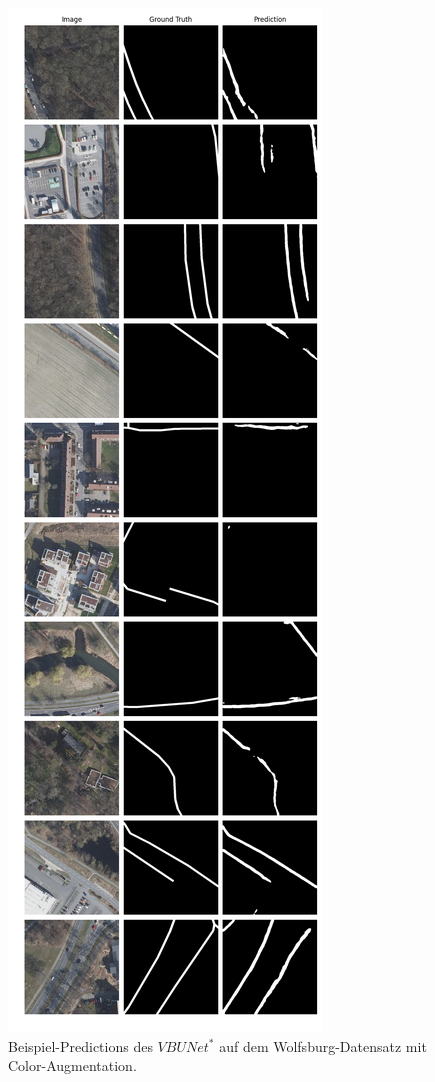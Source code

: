 \begin{figure}
	\centering
	\includegraphics[width=.41\textwidth]{Bilder/wolfsburg-color-samples/vbunet-s.png}
	\caption{Beispiel-Predictions des $VBUNet^*$ auf dem Wolfsburg-Datensatz mit Color-Augmentation.}
	\label{fig:wolfsburg-color-samples-vbunet-s}
\end{figure}


	
	